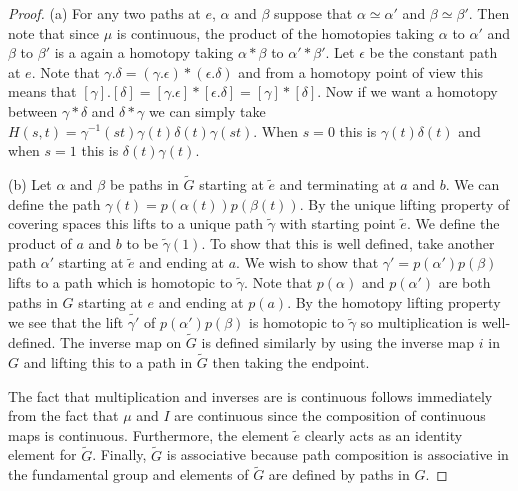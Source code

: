 \documentclass{article}
\begin{document}
\begin{proof}
(a) For any two paths at $e$, $\alpha$ and $\beta$ suppose that $\alpha \simeq \alpha'$ and $\beta \simeq \beta'$. Then note that since $\mu$ is continuous, the product of the homotopies taking $\alpha$ to $\alpha'$ and $\beta$ to $\beta'$ is a again a homotopy taking $\alpha * \beta$ to $\alpha' * \beta'$. Let $\epsilon$ be the constant path at $e$. Note that $\gamma.\delta = (\gamma .\epsilon)*(\epsilon .\delta)$ and from a homotopy point of view this means that $[\gamma].[\delta] = [\gamma . \epsilon]*[\epsilon . \delta] = [\gamma] * [\delta]$. Now if we want a homotopy between $\gamma * \delta$ and $\delta * \gamma$ we can simply take $H(s,t) = \gamma^{-1}(st)\gamma(t)\delta(t)\gamma(st)$. When $s = 0$ this is $\gamma(t)\delta(t)$ and when $s = 1$ this is $\delta(t)\gamma(t)$.

(b) Let $\alpha$ and $\beta$ be paths in $\widetilde{G}$ starting at $\widetilde{e}$ and terminating at $a$ and $b$. We can define the path $\gamma (t) = p(\alpha (t))p(\beta (t))$. By the unique lifting property of covering spaces this lifts to a unique path $\widetilde{\gamma}$ with starting point $\widetilde{e}$. We define the product of $a$ and $b$ to be $\widetilde{\gamma}(1)$. To show that this is well defined, take another path $\alpha'$ starting at $\widetilde{e}$ and ending at $a$. We wish to show that $\gamma' = p(\alpha')p(\beta)$ lifts to a path which is homotopic to $\widetilde{\gamma}$. Note that $p(\alpha)$ and $p(\alpha')$ are both paths in $G$ starting at $e$ and ending at $p(a)$. By the homotopy lifting property we see that the lift $\widetilde{\gamma'}$ of $p(\alpha')p(\beta)$ is homotopic to $\widetilde{\gamma}$ so multiplication is well-defined. The inverse map on $\widetilde{G}$ is defined similarly by using the inverse map $i$ in $G$ and lifting this to a path in $\widetilde{G}$ then taking the endpoint.

The fact that multiplication and inverses are is continuous follows immediately from the fact that $\mu$ and $I$ are continuous since the composition of continuous maps is continuous. Furthermore, the element $\widetilde{e}$ clearly acts as an identity element for $\widetilde{G}$. Finally, $\widetilde{G}$ is associative because path composition is associative in the fundamental group and elements of $\widetilde{G}$ are defined by paths in $G$.
\end{proof}
\end{document}
